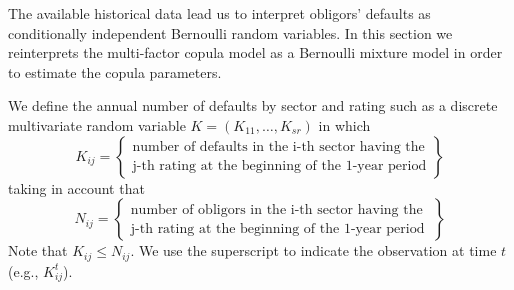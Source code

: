 \documentclass[11pt,fleqn]{book} %
\begin{document}
The available historical data lead us to interpret obligors' defaults as 
conditionally independent Bernoulli random variables. In this section we 
reinterprets the multi-factor copula model as a Bernoulli mixture model in 
order to estimate the copula parameters.

\begin{definition}
	We define the annual number of defaults by sector and rating such as a
	discrete multivariate random variable $K=(K_{11}, \dots, K_{sr})$ in which
	\begin{displaymath}
		K_{ij} = \left\{
		\begin{array}{c}
			\text{number of defaults in the i-th sector having the} \\
			\text{j-th rating at the beginning of the 1-year period}
		\end{array}
		\right\}
	\end{displaymath}
	taking in account that
	\begin{displaymath}
		N_{ij} = \left\{
		\begin{array}{c}
			\text{number of obligors in the i-th sector having the } \\
			\text{j-th rating at the beginning of the 1-year period}
		\end{array}
		\right\}
	\end{displaymath}
	Note that $K_{ij} \le N_{ij}$. We use the superscript to indicate 
	the observation at time $t$ (e.g., $K_{ij}^t$).
\end{definition}
\end{document}
